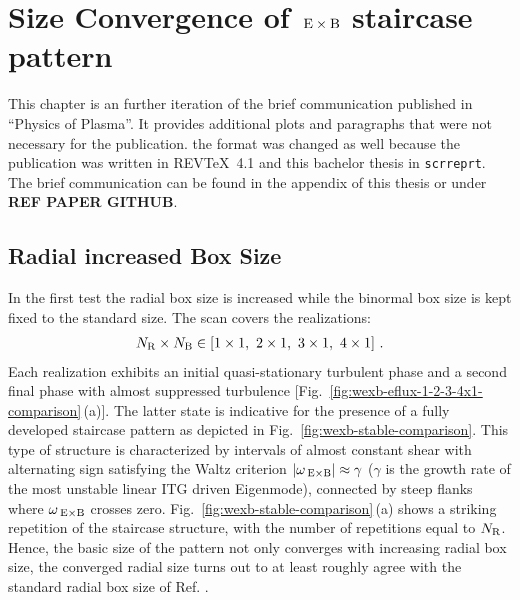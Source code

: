 
\newpage
\section{Size Convergence of $\mathrm{\:E}\times\mathrm{B}$ staircase pattern}
\label{sec:convergence}

This chapter is an further iteration of the brief communication published in \enquote{Physics of Plasma}. It provides additional plots and paragraphs that were not necessary for the publication. the format was changed as well because the publication was written in REV\TeX~4.1 and this bachelor thesis in \texttt{scrreprt}. The brief communication can be found in the appendix of this thesis or under \textbf{REF PAPER GITHUB}.

\subsection{Radial increased Box Size}
\label{sub:radial}

In the first test the radial box size is increased while the binormal box size is kept fixed to the standard size. The scan covers the realizations: 
\begin{gather*}
	N_\mathrm{R} \times N_\mathrm{B} \in [1\times1,~2\times1,~3\times1,~4\times1]~.
\end{gather*}
Each realization exhibits an initial quasi-stationary turbulent phase and a second final \cite{peeters2016} phase with almost suppressed turbulence [Fig.~\ref{fig:wexb-eflux-1-2-3-4x1-comparison}\,(a)].
The latter state is indicative for the presence of a fully developed staircase pattern as depicted in Fig.~\ref{fig:wexb-stable-comparison}. 
This type of structure is characterized by intervals of almost constant shear with alternating sign satisfying the Waltz criterion $|\omega_{\mathrm{\:E \times B}}| \approx \gamma$\cite{doi:10.1063/1.870934, doi:10.1063/1.872847} ($\gamma$ is the growth rate of the most unstable linear ITG driven Eigenmode), connected by steep flanks where $\omega_{\mathrm{\:E \times B}}$ crosses zero.
Fig.~\ref{fig:wexb-stable-comparison}\,(a) shows a striking repetition of the staircase structure, with the number of repetitions equal to $N_\mathrm{R}$.
Hence, the basic size of the pattern not only converges with increasing radial box size, the converged radial size turns out to at least roughly agree with the standard radial box size of Ref. . \bigskip


